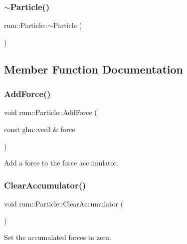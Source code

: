 \subsubsection{\texorpdfstring{$\sim$\+Particle()}{~Particle()}}
{\footnotesize\ttfamily rum\+::\+Particle\+::$\sim$\+Particle (\begin{DoxyParamCaption}{ }\end{DoxyParamCaption})\hspace{0.3cm}{\ttfamily [virtual]}}



\subsection{Member Function Documentation}
\mbox{\label{classrum_1_1_particle_afe6a59e7c46860227b61b57eee5a37b0}} 
\subsubsection{\texorpdfstring{Add\+Force()}{AddForce()}}
{\footnotesize\ttfamily void rum\+::\+Particle\+::\+Add\+Force (\begin{DoxyParamCaption}\item[{const glm\+::vec3 \&}]{force }\end{DoxyParamCaption})}

Add a force to the force accumulator. \mbox{\label{classrum_1_1_particle_adb76d2210f9fc1f95839a3c116a52b38}} 
\subsubsection{\texorpdfstring{Clear\+Accumulator()}{ClearAccumulator()}}
{\footnotesize\ttfamily void rum\+::\+Particle\+::\+Clear\+Accumulator (\begin{DoxyParamCaption}{ }\end{DoxyParamCaption})}

Set the accumulated forces to zero. \mbox{\label{classrum_1_1_particle_a2fee14e654f4914de9c5455d26223b86}} 
